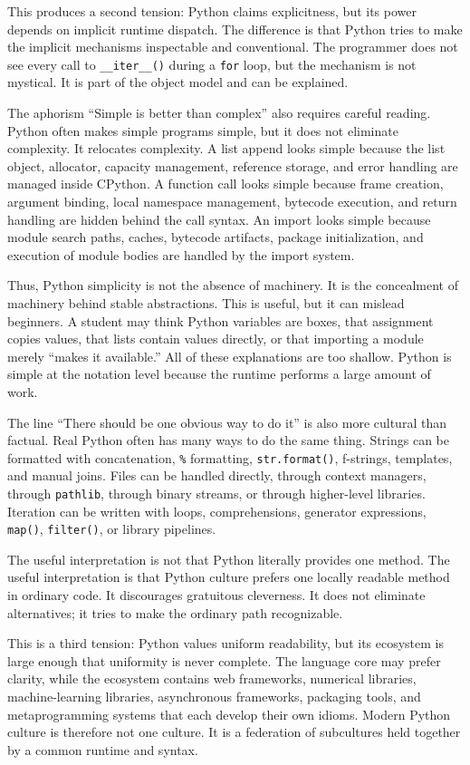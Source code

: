 This produces a second tension: Python claims explicitness, but its power depends on implicit runtime dispatch. The difference is that Python tries to make the implicit mechanisms inspectable and conventional. The programmer does not see every call to \texttt{\_\_iter\_\_()} during a \texttt{for} loop, but the mechanism is not mystical. It is part of the object model and can be explained.

The aphorism “Simple is better than complex” also requires careful reading. Python often makes simple programs simple, but it does not eliminate complexity. It relocates complexity. A list append looks simple because the list object, allocator, capacity management, reference storage, and error handling are managed inside CPython. A function call looks simple because frame creation, argument binding, local namespace management, bytecode execution, and return handling are hidden behind the call syntax. An import looks simple because module search paths, caches, bytecode artifacts, package initialization, and execution of module bodies are handled by the import system.

Thus, Python simplicity is not the absence of machinery. It is the concealment of machinery behind stable abstractions. This is useful, but it can mislead beginners. A student may think Python variables are boxes, that assignment copies values, that lists contain values directly, or that importing a module merely “makes it available.” All of these explanations are too shallow. Python is simple at the notation level because the runtime performs a large amount of work.

The line “There should be one obvious way to do it” is also more cultural than factual. Real Python often has many ways to do the same thing. Strings can be formatted with concatenation, \texttt{\%} formatting, \texttt{str.format()}, f-strings, templates, and manual joins. Files can be handled directly, through context managers, through \texttt{pathlib}, through binary streams, or through higher-level libraries. Iteration can be written with loops, comprehensions, generator expressions, \texttt{map()}, \texttt{filter()}, or library pipelines.

The useful interpretation is not that Python literally provides one method. The useful interpretation is that Python culture prefers one locally readable method in ordinary code. It discourages gratuitous cleverness. It does not eliminate alternatives; it tries to make the ordinary path recognizable.

This is a third tension: Python values uniform readability, but its ecosystem is large enough that uniformity is never complete. The language core may prefer clarity, while the ecosystem contains web frameworks, numerical libraries, machine-learning libraries, asynchronous frameworks, packaging tools, and metaprogramming systems that each develop their own idioms. Modern Python culture is therefore not one culture. It is a federation of subcultures held together by a common runtime and syntax.

